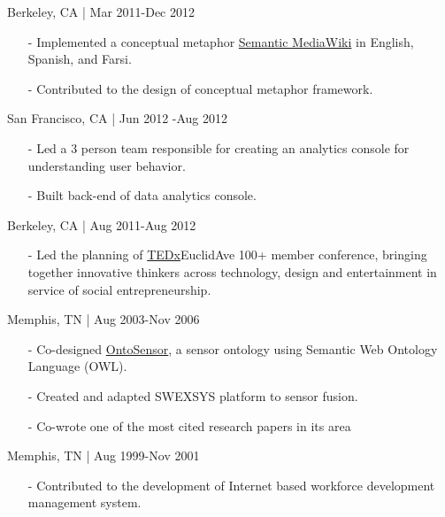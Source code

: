 \documentclass[11pt,article,oneside]{memoir}
\begin{document}
 \hfill Berkeley, CA | Mar 2011-Dec 2012
\begin{itemize}[noitemsep,nolistsep]
\item[-] Implemented a conceptual metaphor \href{http://metaphor.icsi.berkeley.edu}{Semantic MediaWiki} in English, Spanish, and Farsi.
\item[-] Contributed to the design of conceptual metaphor framework.
\end{itemize} 

 \hfill San Francisco, CA | Jun 2012 -Aug 2012
\begin{itemize}[noitemsep,nolistsep]
\item[-]Led a 3 person team responsible for creating an analytics console for understanding user behavior.
\item[-]Built back-end of data analytics console.
\end{itemize} 

 \hfill Berkeley, CA | Aug 2011-Aug 2012
\begin{itemize}[noitemsep,nolistsep]
\item[-]Led the planning of \href{http://www.ted.com/tedx/events/3790}{TEDx}EuclidAve 100+ member conference, bringing together innovative thinkers across technology, design and entertainment in service of social entrepreneurship.
\end{itemize} 

 \hfill Memphis, TN | Aug 2003-Nov 2006
\begin{itemize}[noitemsep,nolistsep]
\item[-]Co-designed \href{https://scholar.google.com/scholar?hl=en&q=Building+a+Sensor+Ontology\%3A+A+Practical+Approach+Leveraging+ISO+and+OGC+Models.&btnG=&as_sdt=1\%2C43&as_sdtp=}{OntoSensor}, a sensor ontology using Semantic Web Ontology Language (OWL).
\item[-]Created and adapted SWEXSYS platform to sensor fusion.
\item[-]Co-wrote one of the most cited research papers in its area\\
\end{itemize}

 \hfill Memphis, TN | Aug 1999-Nov 2001
\begin{itemize}[noitemsep,nolistsep]
\item[-]Contributed to the development of Internet based workforce development management system.
\end{itemize} 
\end{document}
